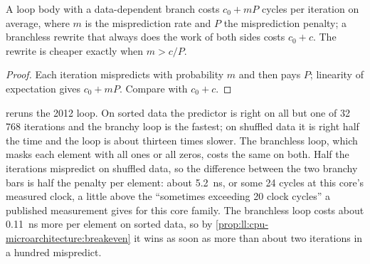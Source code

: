 \begin{proposition}\label{prop:ll:cpu-microarchitecture:breakeven}
A loop body with a data-dependent branch costs $c_0 + mP$ cycles per iteration on average, where $m$ is the
misprediction rate and $P$ the misprediction penalty; a branchless rewrite that always does the work of both sides
costs $c_0 + c$. The rewrite is cheaper exactly when $m > c/P$.
\end{proposition}

\begin{proof}
Each iteration mispredicts with probability $m$ and then pays $P$; linearity of expectation gives $c_0 + mP$. Compare
with $c_0 + c$.
\end{proof}

 reruns the 2012 loop. On sorted data the predictor is right on all but one
of 32\,768 iterations and the branchy loop is the fastest; on shuffled data it is right half the time and the loop is
about thirteen times slower. The branchless loop, which masks each element with all ones or all zeros, costs the same
on both. Half the iterations mispredict on shuffled data, so the difference between the two branchy bars is half the
penalty per element: about \qty{5.2}{\nano\second}, or some 24 cycles at this core's measured clock, a little above the
``sometimes exceeding 20 clock cycles'' a published measurement gives for this core family. The branchless loop
costs about \qty{0.11}{\nano\second} more per element on sorted data, so by
\cref{prop:ll:cpu-microarchitecture:breakeven} it wins as soon as more than about two iterations in a hundred
mispredict.

\begin{omfigure}

\label{fig:ll:cpu-microarchitecture:branch}
\end{omfigure}

